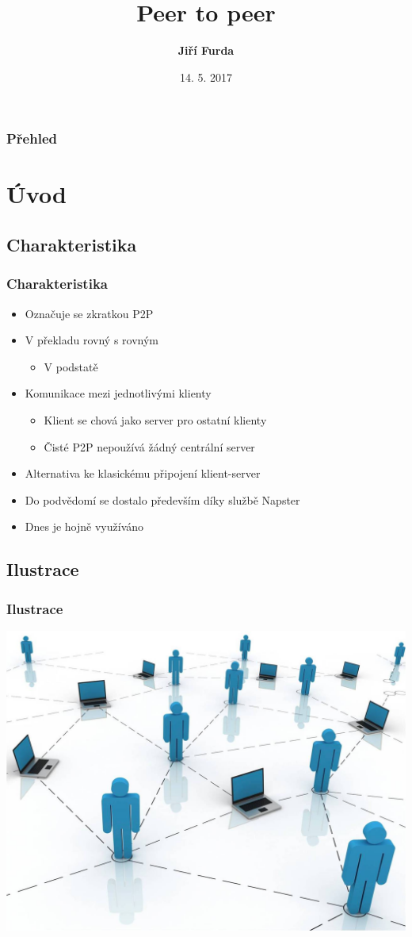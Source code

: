 \documentclass{beamer}
\title[Short title]{\textbf{Peer to peer}}
\author{\textbf{Jiří Furda}}
\institute[FIT VUT]
{
\textsc{Fakulta informačních technologií \\
Vysoké učení technické v~Brně} \\
}
\date{14. 5. 2017}
\begin{document}
\begin{frame}
\titlepage
\end{frame}

\begin{frame}
\frametitle{Přehled}
\tableofcontents 
\end{frame}

\section{Úvod}

\subsection{Charakteristika}
\begin{frame}
\frametitle{Charakteristika}
\begin{itemize}
\item Označuje se zkratkou P2P
\item V překladu rovný s rovným
\begin{itemize}
\item V podstatě 
\end{itemize}
\item Komunikace mezi jednotlivými klienty
\begin{itemize}
\item Klient se chová jako server pro ostatní klienty
\item Čisté P2P nepoužívá žádný centrální server
\end{itemize}
\item Alternativa ke klasickému připojení klient-server
\item Do podvědomí se dostalo především díky službě Napster
\item Dnes je hojně využíváno
\end{itemize}
\end{frame}

\subsection{Ilustrace}
\begin{frame}
\frametitle{Ilustrace}
\includegraphics[scale=0.5]{people}
\end{frame}
\end{document}
